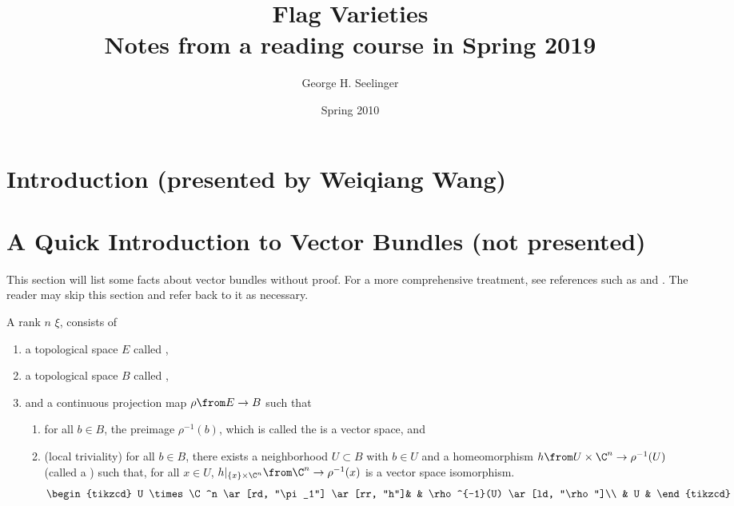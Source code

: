 \documentclass[11pt,leqno,oneside]{amsbook}
\title[Flag Varieties]{Flag Varieties \\ Notes
  from a reading course in Spring 2019}
\author{George H. Seelinger}
\date{Spring 2010}
\numberwithin{thm}{section}
\begin{document}
\maketitle
\section{Introduction (presented by Weiqiang Wang)}
\section{A Quick Introduction to Vector Bundles (not presented)}
This section will list some facts about vector bundles without
proof. For a more comprehensive treatment, see references such as
\cite{bott-tu} and \cite{milnor-stasheff}. The reader may skip this
section and refer back to it as necessary. 
\begin{defn}\label{defn-of-vector-bundle}
  A rank \(n\)  \(\xi\), consists of
  \begin{enumerate}
  \item a topological space \(E\) called ,
  \item a topological space \(B\) called ,
  \item and a continuous projection map \(\rho \from E \to B\) such that
    \begin{enumerate}[label=(\roman*)]
    \item for all \(b \in B\), the preimage \(\rho^{-1}(b)\), which is
      called the  is a vector space, and
    \item (local triviality) for all \(b \in B\), there exists a neighborhood \(U \subset
      B\) with \(b \in U\) and a homeomorphism \(h \from U \times \C^n
      \to \rho^{-1}(U)\) (called a ) such
      that, for all \(x \in U\), \(h|_{\{x\} 
        \times \C^n} \from \C^n \to \rho^{-1}(x)\) is a vector space
      isomorphism. \[
        \begin{tikzcd}
          U \times \C^n \ar[rd, "\pi_1"] \ar[rr, "h"]& & \rho^{-1}(U)
          \ar[ld, "\rho"]\\
          & U &
        \end{tikzcd}
      \]
    \end{enumerate}
  \end{enumerate}
\end{defn}
\end{document}
